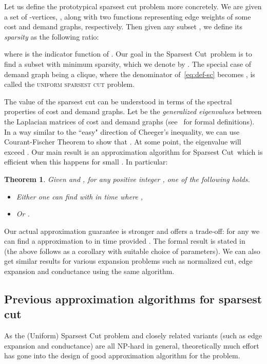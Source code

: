 \documentclass{article}
\newtheorem{theorem}{Theorem}[section]
\newcommand{\nusc}{\textsc{\sf Non-Uniform Sparsest Cut}}
\newcounter{alg-count}
\def\ngap{}
\renewcommand{\nusc}{{\sc Sparsest Cut}}
\newcommand{\vnote}[1]{}
\newcommand{\aknote}[1]{}
\begin{document}
Let us define the prototypical sparsest cut problem more
concretely. We are given a set of -vertices, , along with two
functions  representing edge weights of
some cost and demand graphs, respectively.  Then given any subset , we define its {\em sparsity} as the following ratio:

where  is the indicator function of .  Our goal in the
\nusc\ problem is to find a subset  with minimum sparsity,
which we denote by .
The special case of demand graph being a clique, where the denominator
of~\cref{eq:def-sc} becomes , is called the
\textsc{uniform sparsest cut} problem.

The value of the sparsest cut can be understood in terms of the
spectral properties of cost and demand graphs.  Let  be the {\em generalized
  eigenvalues} between the Laplacian matrices of cost and demand
graphs (see~ for formal definitions).  In a way
similar to the ``easy" direction of Cheeger's inequality, we can use
Courant-Fischer Theorem to show that . \vnote{Should it be , or is it
   for generalized eigenvalues. Would be good to mention it
  explicitly if latter.} \aknote{Should be , good catch!
  See footnote.}
At some point, the eigenvalue  will exceed
. Our main result is an approximation algorithm for \nusc\ which is
efficient when this happens for small . In particular:
\begin{theorem}\label{thm:intro-main-1}
Given  and , for any positive integer ,
one of the following holds. \begin{itemize}
\itemsep=0ex
\item Either one can find  with 
  in time  where ,
\item Or .
\end{itemize}
\end{theorem}
Our actual approximation guarantee is stronger and offers a trade-off:
for any  we can find a 
approximation to  in  time
provided . The formal result is
stated in~ (the above follows as a corollary with
suitable choice of parameters).
We can also get similar results for various expansion problems such as
normalized cut, edge expansion and conductance using the same
algorithm.
\ngap
\subsection{Previous approximation algorithms for sparsest cut}
\label{sec:related-work}
As the {\sc (Uniform) Sparsest Cut} problem and closely related
variants (such as edge expansion and conductance) are all NP-hard in
general, theoretically much effort has gone into the design of good
approximation algorithm for the problem.
\end{document}
